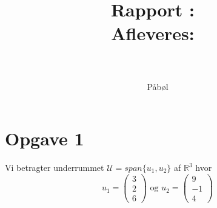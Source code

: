 \documentclass[a4paper,fleqn]{article}
\title{Rapport}
\author{P\aa b\o l}
\date{}
\title{
	\vspace{2in}
	\textmd{\textbf{\hmwkClass:\ \hmwkTitle}}\\
	\normalsize\vspace{0.1in}\small{Afleveres:\ \hmwkDueDate}\\
	\vspace{0.1in}\large{\textit{\hmwkClassInstructor}}\\
	\normalsize\vspace{0.5in} \hmwkProblem 
	\vspace{3in}
}
\author{\textbf{\hmwkAuthorName}}
\newcommand{\RR}{\mathbb{R}}
\newcommand{\U}{\mathcal{U}}
\begin{document}
	\maketitle
	\newpage
	\setcounter{page}{1}
	\section{Opgave 1}
	Vi betragter underrummet $\U = span\{u_1,u_2\}$ af $\RR^3$ hvor
	\[ u_1 = \begin{pmatrix}3\\2\\6\end{pmatrix} \text{ og } 
	u_2=\begin{pmatrix}9\\-1\\4\end{pmatrix}\]
	
\end{document}
